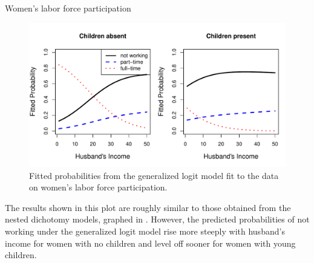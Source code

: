 \documentclass[11pt]{book}
\renewenvironment{knitrout}{\small\renewcommand{\baselinestretch}{.85}}{} %
\begin{document}
\begin{Example}[wlfpart2]{Women's labor force participation}
\begin{knitrout}
\begin{kframe}
\begin{alltt}
   \hlopt{==}\hlstd{) \{}
  \hlstd{(}\hlstd{,} \hlstd{=}\hlopt{:}\hlstd{,} \hlstd{=}\hlstd{,} \hlstd{=}\hlstd{(}\hlstd{,} \hlstd{,} \hlstd{),}
    \hlstd{=}\hlstd{(}\hlstd{,} \hlstd{,} \hlstd{))}
    \hlstd{\}}
\hlstd{\}}
\end{alltt}
\end{kframe}\begin{figure}[!htbp]


\centerline{\includegraphics[width=.9\textwidth]{ch07/fig/wlf-multi-prob} }

\caption[Fitted probabilities from the generalized logit model fit to the data on women's labor force participation]{Fitted probabilities from the generalized logit model fit to the data on women's labor force participation.\label{fig:wlf-multi-prob}}
\end{figure}


\end{knitrout}
The results shown in this plot are roughly similar to those obtained from the nested dichotomy models,
graphed in . However,
the predicted probabilities of not working under the generalized logit model rise more steeply
with husband's income for women with no children and level off sooner for women with
young children.


\end{Example}
\end{document}
